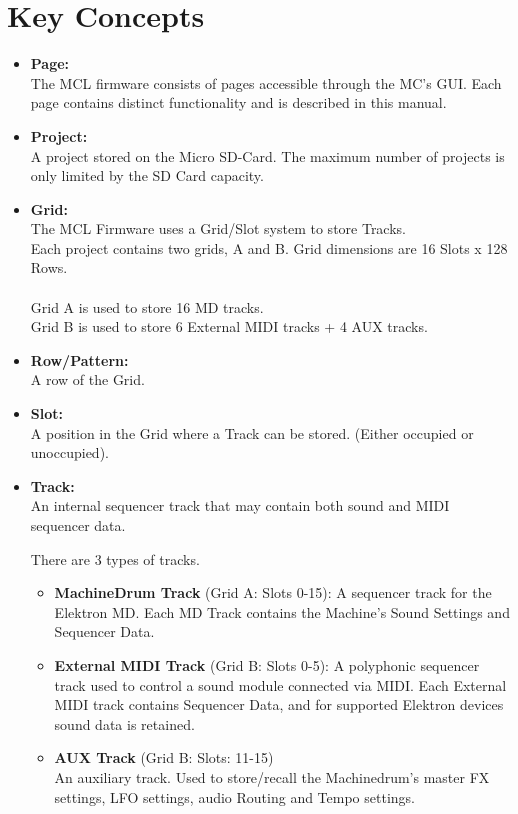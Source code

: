 \chapter{Key Concepts}

\begin{itemize}
\item \textbf{Page:}
\\
The MCL firmware consists of pages accessible through the MC's GUI. Each page contains distinct functionality and is described in this manual.
\item \textbf{Project:}
\\
A project stored on the Micro SD-Card.
The maximum number of projects is only limited by the SD Card capacity.

\item \textbf{Grid:}
\\
The MCL Firmware uses a Grid/Slot system to store Tracks.\\
Each project contains two grids, A and B. Grid dimensions are 16 Slots x 128 Rows.\\
\\
Grid A is used to store 16 MD tracks.\\Grid B is used to store 6 External MIDI tracks + 4 AUX tracks.

\item \textbf{Row/Pattern:}
\\
A row of the Grid.

\item \textbf{Slot:}
\\
A position in the Grid where a Track can be stored. (Either occupied or unoccupied).

\item \textbf{Track:}
\\
An internal sequencer track that may contain both sound and MIDI sequencer data.

There are 3 types of tracks.
\begin{itemize}

\item \textbf{MachineDrum Track} (Grid A: Slots 0-15):
A sequencer track for the Elektron MD. Each MD Track contains the Machine's Sound Settings and Sequencer Data.

\item \textbf{External MIDI Track} (Grid B: Slots 0-5):
A polyphonic sequencer track used to control a sound module connected via MIDI. Each External MIDI track contains Sequencer Data, and for supported Elektron devices sound data is retained. 

\item \textbf{AUX Track} (Grid B: Slots: 11-15)\\
An auxiliary track. Used to store/recall the Machinedrum's master FX settings, LFO settings, audio Routing and Tempo settings.
\end{itemize}

\end{itemize}

